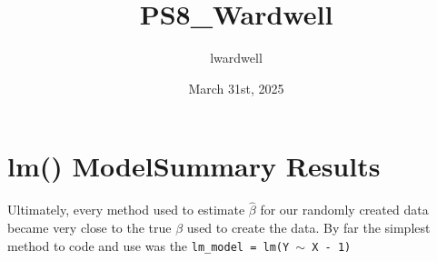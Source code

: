 \documentclass{article}
\title{PS8\_Wardwell}
\author{lwardwell}
\date{March 31st, 2025}
\begin{document}
\maketitle

\section*{lm() ModelSummary Results}
Ultimately, every method used to estimate $\hat{\beta}$ for our randomly created data became very close to the true $\beta$ used to create the data. By far the simplest method to code and use was the \texttt{lm\_model = lm(Y $\sim$ X - 1)} 
\begin{center}
   
\end{center}
\end{document}
